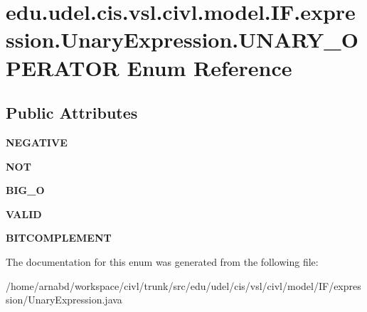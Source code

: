 \hypertarget{enumedu_1_1udel_1_1cis_1_1vsl_1_1civl_1_1model_1_1IF_1_1expression_1_1UnaryExpression_1_1UNARY__OPERATOR}{}\section{edu.\+udel.\+cis.\+vsl.\+civl.\+model.\+I\+F.\+expression.\+Unary\+Expression.\+U\+N\+A\+R\+Y\+\_\+\+O\+P\+E\+R\+A\+T\+O\+R Enum Reference}
\label{enumedu_1_1udel_1_1cis_1_1vsl_1_1civl_1_1model_1_1IF_1_1expression_1_1UnaryExpression_1_1UNARY__OPERATOR}
\subsection*{Public Attributes}
\begin{DoxyCompactItemize}
\item 
\hypertarget{enumedu_1_1udel_1_1cis_1_1vsl_1_1civl_1_1model_1_1IF_1_1expression_1_1UnaryExpression_1_1UNARY__OPERATOR_a28ed119ed4b98c1247f4b68634b0ab1c}{}{\bfseries N\+E\+G\+A\+T\+I\+V\+E}\label{enumedu_1_1udel_1_1cis_1_1vsl_1_1civl_1_1model_1_1IF_1_1expression_1_1UnaryExpression_1_1UNARY__OPERATOR_a28ed119ed4b98c1247f4b68634b0ab1c}

\item 
\hypertarget{enumedu_1_1udel_1_1cis_1_1vsl_1_1civl_1_1model_1_1IF_1_1expression_1_1UnaryExpression_1_1UNARY__OPERATOR_a0c570d2140345389967e4161c8c21404}{}{\bfseries N\+O\+T}\label{enumedu_1_1udel_1_1cis_1_1vsl_1_1civl_1_1model_1_1IF_1_1expression_1_1UnaryExpression_1_1UNARY__OPERATOR_a0c570d2140345389967e4161c8c21404}

\item 
\hypertarget{enumedu_1_1udel_1_1cis_1_1vsl_1_1civl_1_1model_1_1IF_1_1expression_1_1UnaryExpression_1_1UNARY__OPERATOR_af4112122973e946c7043acdd95e31cce}{}{\bfseries B\+I\+G\+\_\+\+O}\label{enumedu_1_1udel_1_1cis_1_1vsl_1_1civl_1_1model_1_1IF_1_1expression_1_1UnaryExpression_1_1UNARY__OPERATOR_af4112122973e946c7043acdd95e31cce}

\item 
\hypertarget{enumedu_1_1udel_1_1cis_1_1vsl_1_1civl_1_1model_1_1IF_1_1expression_1_1UnaryExpression_1_1UNARY__OPERATOR_a1c6c7541c11828bd848a14be7902d29c}{}{\bfseries V\+A\+L\+I\+D}\label{enumedu_1_1udel_1_1cis_1_1vsl_1_1civl_1_1model_1_1IF_1_1expression_1_1UnaryExpression_1_1UNARY__OPERATOR_a1c6c7541c11828bd848a14be7902d29c}

\item 
\hypertarget{enumedu_1_1udel_1_1cis_1_1vsl_1_1civl_1_1model_1_1IF_1_1expression_1_1UnaryExpression_1_1UNARY__OPERATOR_a1a943526920951ec053995145fe50cba}{}{\bfseries B\+I\+T\+C\+O\+M\+P\+L\+E\+M\+E\+N\+T}\label{enumedu_1_1udel_1_1cis_1_1vsl_1_1civl_1_1model_1_1IF_1_1expression_1_1UnaryExpression_1_1UNARY__OPERATOR_a1a943526920951ec053995145fe50cba}

\end{DoxyCompactItemize}


The documentation for this enum was generated from the following file\+:\begin{DoxyCompactItemize}
\item 
/home/arnabd/workspace/civl/trunk/src/edu/udel/cis/vsl/civl/model/\+I\+F/expression/Unary\+Expression.\+java\end{DoxyCompactItemize}
